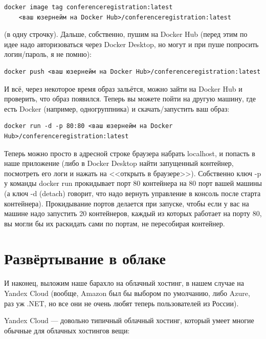 \documentclass{../../text-style}
\begin{document}
\begin{verbatim}
docker image tag conferenceregistration:latest 
    <ваш юзернейм на Docker Hub>/conferenceregistration:latest
\end{verbatim}

(в одну строчку). Дальше, собственно, пушим на Docker Hub (перед этим по идее надо авторизоваться через Docker Desktop, но могут и при пуше попросить логин/пароль, я не помню):

\begin{verbatim}
docker push <ваш юзернейм на Docker Hub>/conferenceregistration:latest
\end{verbatim}

И всё, через некоторое время образ зальётся, можно зайти на Docker Hub и проверить, что образ появился. Теперь вы можете пойти на другую машину, где есть Docker (например, одногруппника) и скачать/запустить ваш образ:

\begin{verbatim}
docker run -d -p 80:80 <ваш юзернейм на Docker Hub>/conferenceregistration:latest
\end{verbatim}

Теперь можно просто в адресной строке браузера набрать localhost, и попасть в наше приложение (либо в Docker Desktop найти запущенный контейнер, посмотреть его логи и нажать на <<открыть в браузере>>). Собственно ключ -p у команды docker run прокидывает порт 80 контейнера на 80 порт вашей машины (а ключ -d (detach) говорит, что надо вернуть управление в консоль после старта контейнера). Прокидывание портов делается при запуске, чтобы если у вас на машине надо запустить 20 контейнеров, каждый из которых работает на порту 80, вы могли бы их раскидать сами по портам, не пересобирая контейнер.

\section{Развёртывание в облаке}

И наконец, выложим наше барахло на облачный хостинг, в нашем случае на Yandex Cloud (вообще, Amazon был бы выбором по умолчанию, либо Azure, раз уж .NET, но все они не очень любят теперь пользователей из России).

Yandex Cloud --- довольно типичный облачный хостинг, который умеет многие обычные для облачных хостингов вещи:
\end{document}
